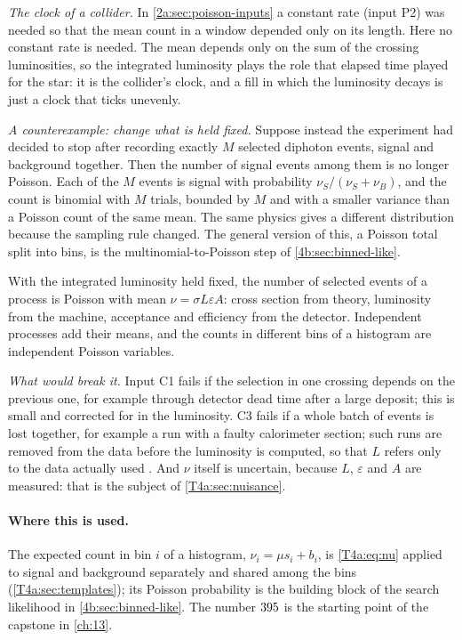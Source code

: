 \emph{The clock of a collider.} In \cref{2a:sec:poisson-inputs} a constant rate (input P2) was needed so that the mean count in a window depended only on its length. Here no constant rate is needed. The mean depends only on the sum of the crossing luminosities, so the integrated luminosity plays the role that elapsed time played for the star: it is the collider's clock, and a fill in which the luminosity decays is just a clock that ticks unevenly.

\emph{A counterexample: change what is held fixed.} Suppose instead the experiment had decided to stop after recording exactly $M$ selected diphoton events, signal and background together. Then the number of signal events among them is no longer Poisson. Each of the $M$ events is signal with probability $\nu_S/(\nu_S+\nu_B)$, and the count is binomial with $M$ trials, bounded by $M$ and with a smaller variance than a Poisson count of the same mean. The same physics gives a different distribution because the sampling rule changed. The general version of this, a Poisson total split into bins, is the multinomial-to-Poisson step of \cref{4b:sec:binned-like}.

\begin{keyidea}
With the integrated luminosity held fixed, the number of selected events of a process is Poisson with mean $\nu=\sigma L\varepsilon A$: cross section from theory, luminosity from the machine, acceptance and efficiency from the detector. Independent processes add their means, and the counts in different bins of a histogram are independent Poisson variables.
\end{keyidea}

\emph{What would break it.} Input C1 fails if the selection in one crossing depends on the previous one, for example through detector dead time after a large deposit; this is small and corrected for in the luminosity. C3 fails if a whole batch of events is lost together, for example a run with a faulty calorimeter section; such runs are removed from the data before the luminosity is computed, so that $L$ refers only to the data actually used \cite{SerkinOpenData2020}. And $\nu$ itself is uncertain, because $L$, $\varepsilon$ and $A$ are measured: that is the subject of \cref{T4a:sec:nuisance}.

\paragraph{Where this is used.}
The expected count in bin $i$ of a histogram, $\nu_i=\mu s_i+b_i$, is \eqref{T4a:eq:nu} applied to signal and background separately and shared among the bins (\cref{T4a:sec:templates}); its Poisson probability is the building block of the search likelihood in \cref{4b:sec:binned-like}. The number $395$ is the starting point of the capstone in \cref{ch:13}.
